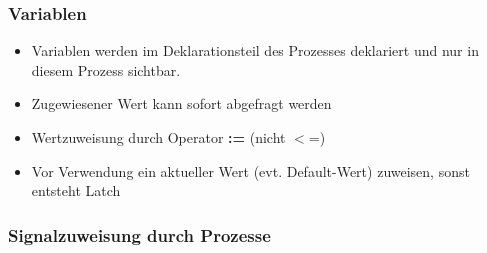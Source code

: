 		\subsubsection{Variablen}
			\begin{multicols}{2}
				\begin{itemize}
					\itemsep0em
					\item Variablen werden im Deklarationsteil des Prozesses deklariert 
						und nur in diesem Prozess sichtbar.
					\item Zugewiesener Wert kann sofort abgefragt werden
					\item Wertzuweisung durch Operator \textbf{:=} (nicht $<$=)
				\end{itemize}
			
				\begin{itemize}
				\itemsep0em
					\item Vor Verwendung ein aktueller Wert (evt. Default-Wert) zuweisen, sonst entsteht Latch
				\end{itemize}
				
			\end{multicols}

		\subsubsection{Signalzuweisung durch Prozesse}
			\begin{multicols}{2}
				
			\end{multicols}

